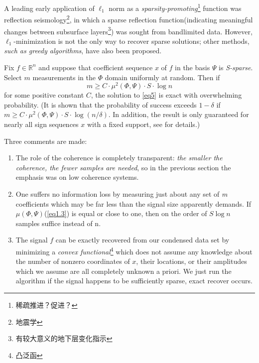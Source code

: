 A leading early application of $\ell_1$ norm as a \emph{sparsity-promoting}\footnote{稀疏推进？促进？} function was reflection seismology\footnote{地震学}, in which a sparse reflection function(indicating meaningful changes between subsurface layers\footnote{有较大意义的地下层变化指示}) was sought from bandlimited data\cite{Claerbout1973,Santosa1986}. However, $\ell_1$-minimization is not the only way to recover sparse solutions; other methods, \emph{\textcolor[rgb]{1,0,0}{such as greedy algorithms}}\cite{Tropp2007}, have also been proposed.

\begin{theorem}\cite{Candes2007}
	\label{th1.1}
	Fix $f \in \mathbb{R}^n$ and suppose that coefficient sequence $x$ of $f$ in the basis $\Psi$ is \emph{S-sparse}. Select $m$ measurements in the $\Phi$ domain uniformly at random. Then if
	\begin{equation}
	\label{eq1.6}
	m \geqslant C \cdot \mu^2(\Phi,\Psi) \cdot S \cdot \log n
	\end{equation}
	for some positive constant $C$, the solution to \cref{eq5} is exact with overwhelming probability. (It is shown that the probability of success exceeds $1-\delta$ if $m \geqslant C \cdot \mu^2(\Phi,\Psi)\cdot S\cdot \log(n/\delta)$. In addition, the result is only guaranteed for nearly all sign sequences $x$ with a fixed support, see \cite{Candes2007} for details.)
\end{theorem}

Three comments are made:
\begin{enumerate}[1)]
	\item The role of the coherence is completely transparent: \emph{the smaller the coherence, the fewer samples are needed}, so in the previous section the emphasis was on low coherence systems.
	\item One suffers no information loss by measuring just about any set of \emph{m} coefficients which may be far less than the signal size apparently demands. \textcolor[rgb]{1,0,0}{If $\mu(\Phi,\Psi)$(\cref{eq1.3}) is equal or close to one, then on the order of $S \log n$ samples suffice instead of n}.
	\item The signal $f$ can be exactly recovered from our condensed data set by minimizing a \emph{convex functional}\footnote{凸泛函} which does not assume any knowledge about the number of nonzero coordinates of $x$, their locations, or their amplitudes which we assume are all completely unknown a priori. We just run the algorithm if the signal happens to be sufficiently sparse, exact recover occurs.
\end{enumerate}

